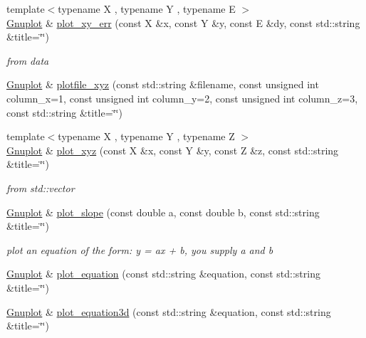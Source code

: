 \begin{DoxyCompactItemize}
\item 
{\footnotesize template$<$typename X , typename Y , typename E $>$ }\\\mbox{\hyperlink{class_gnuplot}{Gnuplot}} \& \mbox{\hyperlink{class_gnuplot_a3c5d382eba33f92b26ba85f201bc7dea}{plot\+\_\+xy\+\_\+err}} (const X \&x, const Y \&y, const E \&dy, const std\+::string \&title=\char`\"{}\char`\"{})
\begin{DoxyCompactList}\small\item\em from data \end{DoxyCompactList}\item 
\mbox{\hyperlink{class_gnuplot}{Gnuplot}} \& \mbox{\hyperlink{class_gnuplot_a9dbde2a91eb816481657f3a22c9b0046}{plotfile\+\_\+xyz}} (const std\+::string \&filename, const unsigned int column\+\_\+x=1, const unsigned int column\+\_\+y=2, const unsigned int column\+\_\+z=3, const std\+::string \&title=\char`\"{}\char`\"{})
\item 
\mbox{\label{class_gnuplot_af89cb366fa7d09ffc1c351516ae54df5}} 
{\footnotesize template$<$typename X , typename Y , typename Z $>$ }\\\mbox{\hyperlink{class_gnuplot}{Gnuplot}} \& \mbox{\hyperlink{class_gnuplot_af89cb366fa7d09ffc1c351516ae54df5}{plot\+\_\+xyz}} (const X \&x, const Y \&y, const Z \&z, const std\+::string \&title=\char`\"{}\char`\"{})
\begin{DoxyCompactList}\small\item\em from std\+::vector \end{DoxyCompactList}\item 
\mbox{\label{class_gnuplot_a51ea5105eb87285820bb93910f8d346c}} 
\mbox{\hyperlink{class_gnuplot}{Gnuplot}} \& \mbox{\hyperlink{class_gnuplot_a51ea5105eb87285820bb93910f8d346c}{plot\+\_\+slope}} (const double a, const double b, const std\+::string \&title=\char`\"{}\char`\"{})
\begin{DoxyCompactList}\small\item\em plot an equation of the form\+: y = ax + b, you supply a and b \end{DoxyCompactList}\item 
\mbox{\hyperlink{class_gnuplot}{Gnuplot}} \& \mbox{\hyperlink{class_gnuplot_a42dfb8c9d4636745c7be277ed818e849}{plot\+\_\+equation}} (const std\+::string \&equation, const std\+::string \&title=\char`\"{}\char`\"{})
\item 
\mbox{\hyperlink{class_gnuplot}{Gnuplot}} \& \mbox{\hyperlink{class_gnuplot_a79aed3a6927f7d1d3497cba441e8a943}{plot\+\_\+equation3d}} (const std\+::string \&equation, const std\+::string \&title=\char`\"{}\char`\"{})

\end{DoxyCompactItemize}
